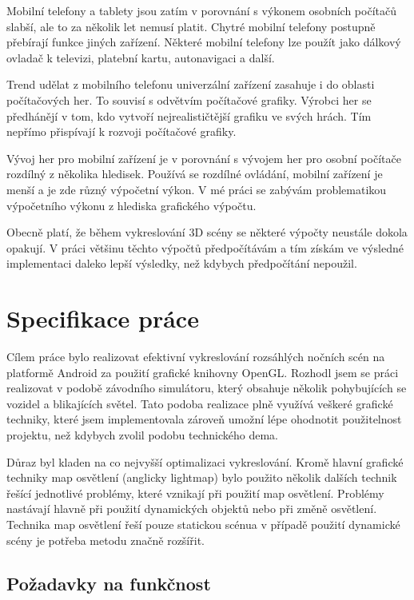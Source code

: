 \documentclass[11pt,twoside,a4paper]{book}
\begin{document}
Mobilní telefony a tablety jsou zatím v porovnání s výkonem osobních počítačů slabší, ale to za několik let nemusí platit. Chytré mobilní telefony postupně přebírají funkce jiných zařízení. Některé mobilní telefony lze použít jako dálkový ovladač k televizi, platební kartu, autonavigaci a další.

Trend udělat z mobilního telefonu univerzální zařízení zasahuje i do oblasti počítačových her. To souvisí s odvětvím počítačové grafiky. Výrobci her se předhánějí v tom, kdo vytvoří nejrealističtější grafiku ve svých hrách. Tím nepřímo přispívají k rozvoji počítačové grafiky.

Vývoj her pro mobilní zařízení je v porovnání s vývojem her pro osobní počítače rozdílný z několika hledisek. Používá se rozdílné ovládání, mobilní zařízení je menší a je zde různý výpočetní výkon. V mé práci se zabývám problematikou výpočetního výkonu z hlediska grafického výpočtu.

Obecně platí, že během vykreslování 3D scény se některé výpočty neustále dokola opakují. V práci většinu těchto výpočtů předpočítávám a tím získám ve výsledné implementaci daleko lepší výsledky, než kdybych předpočítání nepoužil.

\chapter{Specifikace práce}
Cílem práce bylo realizovat efektivní vykreslování rozsáhlých nočních scén na platformě Android za použití grafické knihovny OpenGL. Rozhodl jsem se práci realizovat v podobě závodního simulátoru, který obsahuje několik pohybujících se vozidel a blikajících světel. Tato podoba realizace plně využívá veškeré grafické techniky, které jsem implementoval\linebreak a zároveň umožní lépe ohodnotit použitelnost projektu, než kdybych zvolil podobu technického dema.

Důraz byl kladen na co nejvyšší optimalizaci vykreslování. Kromě hlavní grafické techniky map osvětlení (anglicky lightmap) bylo použito několik dalších technik řešící jednotlivé problémy, které vznikají při použití map osvětlení. Problémy nastávají hlavně při použití dynamických objektů nebo při změně osvětlení. Technika map osvětlení řeší pouze statickou scénu\linebreak a v případě použití dynamické scény je potřeba metodu značně rozšířit.

\section{Požadavky na funkčnost}
\end{document}

